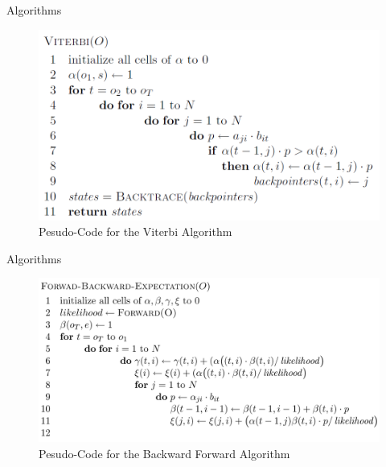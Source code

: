 \documentclass[11pt]{beamer}
\begin{document}
\begin{frame}{Algorithms}
\begin{figure}[H]

\centering
\includegraphics[scale=0.4]{"vit"}
 \caption{Pesudo-Code for the Viterbi Algorithm \cite{cuhmm}}

\end{figure}
\end{frame}

\begin{frame}{Algorithms}
\begin{figure}[H]

\centering
\includegraphics[scale=0.3]{"BW"}
 \caption{Pesudo-Code for the Backward Forward Algorithm \cite{cuhmm}}

\end{figure}
\end{frame}
\end{document}
